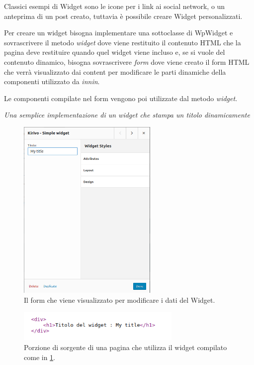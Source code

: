 Classici esempi di Widget sono le icone per i link ai social network, o un anteprima di un post creato, tuttavia è possibile creare Widget
personalizzati.

Per creare un widget bisogna implementare una sottoclasse di WpWidget\cite{WPWID}
e sovrascrivere il metodo \emph{widget} dove viene restituito il contenuto HTML che la pagina deve restituire quando quel widget viene incluso
e, se si vuole del contenuto dinamico, bisogna sovrascrivere \emph{form} dove viene creato il form HTML che verrà visualizzato dai content per modificare le
parti dinamiche della componenti utilizzato da \emph{innin}.

Le componenti compilate nel form vengono poi utilizzate dal metodo \emph{widget}.



\emph{Una semplice implementazione di un widget che stampa un titolo dinamicamente}


\begin{figure}
  \includegraphics[width=0.6\textwidth]{figure/wid_form.png}
  \caption{Il form che viene visualizzato per modificare i dati del Widget.}
  \label{fig:wform}
\end{figure}
\begin{figure}
  \includegraphics[width=0.7\textwidth]{figure/sourcewid.png}
  \caption{Porzione di sorgente di una pagina che utilizza il widget compilato come in \ref{fig:wform}.}
  \label{fig:wsource}
\end{figure}

